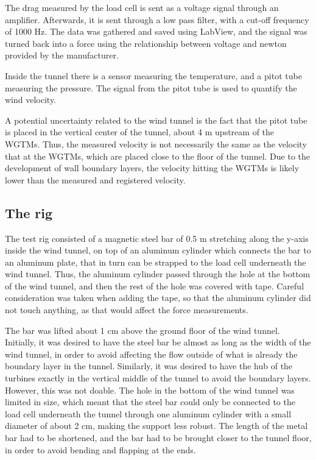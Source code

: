 The drag measured by the load cell is sent as a voltage signal through an amplifier. Afterwards, it is sent through a low pass filter, with a cut-off frequency of 1000 Hz. The data was gathered and saved using LabView, and the signal was turned back into a force using the relationship between voltage and newton provided by the manufacturer. 

Inside the tunnel there is a sensor measuring the temperature, and a pitot tube measuring the pressure. The signal from the pitot tube is used to quantify the wind velocity. 
% 

A potential uncertainty related to the wind tunnel is the fact that the pitot tube is placed in the vertical center of the tunnel, about 4 m upstream of the \gls{WGTM}s. Thus, the measured velocity is not necessarily the same as the velocity that at the \gls{WGTM}s, which are placed close to the floor of the tunnel. Due to the development of wall boundary layers, the velocity hitting the \gls{WGTM}s is likely lower than the measured and registered velocity. 


\subsection{The rig} 
The test rig consisted of a magnetic steel bar of 0.5 \si{\m} stretching along the y-axis inside the wind tunnel, on top of an aluminum cylinder which connects the bar to an aluminum plate, that in turn can be strapped to the load cell underneath the wind tunnel. Thus, the aluminum cylinder passed through the hole at the bottom of the wind tunnel, and then the rest of the hole was covered with tape. Careful consideration was taken when adding the tape, so that the aluminum cylinder did not touch anything, as that would affect the force measurements. 

The bar was lifted about 1 cm above the ground floor of the wind tunnel. Initially, it was desired to have the steel bar be almost as long as the width of the wind tunnel, in order to avoid affecting the flow outside of what is already the boundary layer in the tunnel. Similarly, it was desired to have the hub of the turbines exactly in the vertical middle of the tunnel to avoid the boundary layers. However, this was not doable. The hole in the bottom of the wind tunnel was limited in size, which meant that the steel bar could only be connected to the load cell underneath the tunnel through one aluminum cylinder with a small diameter of about 2 cm, making the support less robust. The length of the metal bar had to be shortened, and the bar had to be brought closer to the tunnel floor, in order to avoid bending and flapping at the ends.






